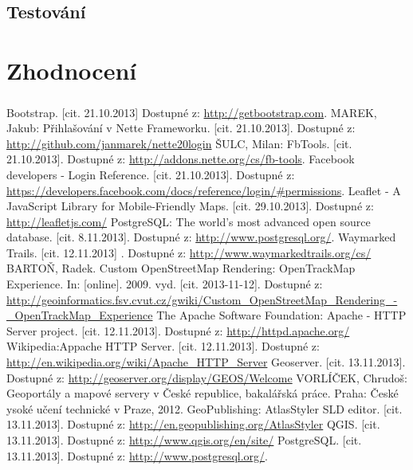 \documentclass[11pt,a4paper,titlepage,oneside]{book}
\begin{document}
		\section{Testování}


	\chapter{Zhodnocení}
		\paragraph{}

\newpage
{}
\begin{thebibliography}{50}
	Bootstrap. [cit. 21.10.2013] Dostupné z: \url{http://getbootstrap.com}.
	MAREK, Jakub: Přihlašování v Nette Frameworku. [cit. 21.10.2013]. Dostupné z: \url{http://github.com/janmarek/nette20login}
	 ŠULC, Milan: FbTools. [cit. 21.10.2013]. Dostupné z: \url{http://addons.nette.org/cs/fb-tools}.
	 Facebook developers - Login Reference. [cit. 21.10.2013]. Dostupné z: \url{https://developers.facebook.com/docs/reference/login/#permissions}.
		Leaflet - A JavaScript Library for Mobile-Friendly Maps. [cit. 29.10.2013]. Dostupné z: \url{http://leafletjs.com/}
	 PostgreSQL: The world's most advanced open source database. [cit. 8.11.2013]. Dostupné z: \url{http://www.postgresql.org/}.
	 Waymarked Trails.  [cit. 12.11.2013] . Dostupné z: \url{http://www.waymarkedtrails.org/cs/}
	 BARTOŇ, Radek. Custom OpenStreetMap Rendering: OpenTrackMap Experience. In: [online]. 2009. vyd. [cit. 2013-11-12]. Dostupné z: \url{http://geoinformatics.fsv.cvut.cz/gwiki/Custom_OpenStreetMap_Rendering_-_OpenTrackMap_Experience}
	The Apache Software Foundation: Apache - HTTP Server project. [cit. 12.11.2013]. Dostupné z: \url{http://httpd.apache.org/}
	Wikipedia:Appache HTTP Server. [cit. 12.11.2013]. Dostupné z: \url{http://en.wikipedia.org/wiki/Apache_HTTP_Server}
	Geoserver. [cit. 13.11.2013]. Dostupné z: \url{http://geoserver.org/display/GEOS/Welcome}
	VORLÍČEK, Chrudoš: Geoportály a mapové servery v České republice, bakalářská práce. Praha: České ysoké učení technické v Praze, 2012.
	GeoPublishing: AtlasStyler SLD editor. [cit. 13.11.2013]. Dostupné z: \url{http://en.geopublishing.org/AtlasStyler}
	QGIS. [cit. 13.11.2013]. Dostupné z: \url{http://www.qgis.org/en/site/}
	 PostgreSQL. [cit. 13.11.2013]. Dostupné z: \url{http://www.postgresql.org/}.
\end{thebibliography}
\end{document}
